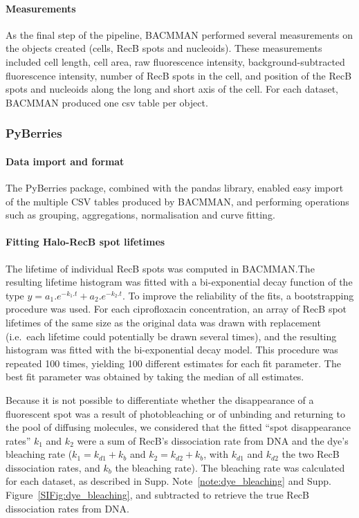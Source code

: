 \paragraph*{Measurements}
As the final step of the pipeline, BACMMAN performed several measurements on the objects created (cells, RecB spots and nucleoids). These measurements included cell length, cell area, raw fluorescence intensity, background-subtracted fluorescence intensity, number of RecB spots in the cell, and position of the RecB spots and nucleoids along the long and short axis of the cell. For each dataset, BACMMAN produced one csv table per object.

\subsubsection*{PyBerries}
\paragraph*{Data import and format}
The PyBerries package, combined with the pandas library, enabled easy import of the multiple CSV tables produced by BACMMAN, and performing operations such as grouping, aggregations, normalisation and curve fitting.

\paragraph*{Fitting Halo-RecB spot lifetimes}
The lifetime of individual Rec\-B spots was computed in BACMMAN.\@ The resulting lifetime histogram was fitted with a bi-exponential decay function of the type $y=a_1.e^{-k_1.t} + a_2.e^{-k_2.t}$. To improve the reliability of the fits, a bootstrapping procedure was used. For each ciprofloxacin concentration, an array of RecB spot lifetimes of the same size as the original data was drawn with replacement (i.e.\ each lifetime could potentially be drawn several times), and the resulting histogram was fitted with the bi-exponential decay model. This procedure was repeated 100 times, yielding 100 different estimates for each fit parameter. The best fit parameter was obtained by taking the median of all estimates.

Because it is not possible to differentiate whether the disappearance of a fluorescent spot was a result of photobleaching or of unbinding and returning to the pool of diffusing molecules, we considered that the fitted ``spot disappearance rates'' $k_1$ and $k_2$ were a sum of RecB's dissociation rate from DNA and the dye's bleaching rate ($k_1=k_{d1}+k_b$ and $k_2=k_{d2}+k_b$, with $k_{d1}$ and $k_{d2}$ the two RecB dissociation rates, and $k_b$ the bleaching rate). The bleaching rate was calculated for each dataset, as described in Supp. Note~\ref{note:dye_bleaching} and Supp. Figure~\ref{SIFig:dye_bleaching}, and subtracted to retrieve the true RecB dissociation rates from DNA.\@

